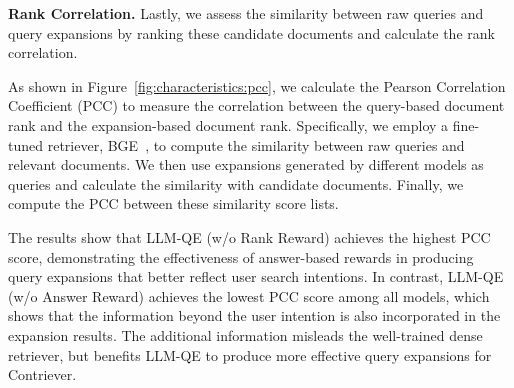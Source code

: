 \textbf{Rank Correlation.} Lastly, we assess the similarity between raw queries and query expansions by ranking these candidate documents and calculate the rank correlation.

As shown in Figure~\ref{fig:characteristics:pcc}, we calculate the Pearson Correlation Coefficient (PCC) to measure the correlation between the query-based document rank and the expansion-based document rank. Specifically, we employ a fine-tuned retriever, BGE~\cite{chen2024bge}, to compute the similarity between raw queries and relevant documents. We then use expansions generated by different models as queries and calculate the similarity with candidate documents. Finally, we compute the PCC between these similarity score lists.

The results show that LLM-QE (w/o Rank Reward) achieves the highest PCC score, demonstrating the effectiveness of answer-based rewards in producing query expansions that better reflect user search intentions. In contrast, LLM-QE (w/o Answer Reward) achieves the lowest PCC score among all models, which shows that the information beyond the user intention is also incorporated in the expansion results. The additional information misleads the well-trained dense retriever, but benefits LLM-QE to produce more effective query expansions for Contriever.


% 





